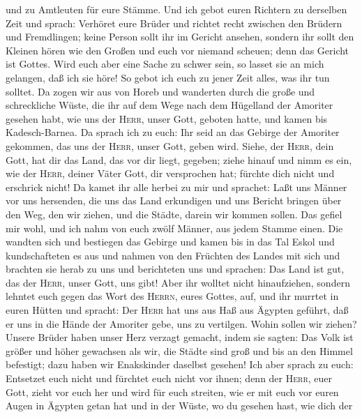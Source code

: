 und zu Amtleuten für eure Stämme.  Und ich gebot euren
Richtern zu derselben Zeit und sprach: Verhöret eure Brüder und richtet
recht zwischen den Brüdern und Fremdlingen;  keine Person
sollt ihr im Gericht ansehen, sondern ihr sollt den Kleinen hören wie
den Großen und euch vor niemand scheuen; denn das Gericht ist Gottes.
Wird euch aber eine Sache zu schwer sein, so lasset sie an mich
gelangen, daß ich sie höre!  So gebot ich euch zu jener
Zeit alles, was ihr tun solltet.  Da zogen wir aus von
Horeb und wanderten durch die große und schreckliche Wüste, die ihr auf
dem Wege nach dem Hügelland der Amoriter gesehen habt, wie uns der
\textsc{Herr}, unser Gott, geboten hatte, und kamen bis Kadesch-Barnea.
 Da sprach ich zu euch: Ihr seid an das Gebirge der
Amoriter gekommen, das uns der \textsc{Herr}, unser Gott, geben wird.
 Siehe, der \textsc{Herr}, dein Gott, hat dir das Land,
das vor dir liegt, gegeben; ziehe hinauf und nimm es ein, wie der
\textsc{Herr}, deiner Väter Gott, dir versprochen hat; fürchte dich
nicht und erschrick nicht!  Da kamet ihr alle herbei zu
mir und sprachet: Laßt uns Männer vor uns hersenden, die uns das Land
erkundigen und uns Bericht bringen über den Weg, den wir ziehen, und die
Städte, darein wir kommen sollen.  Das gefiel mir wohl,
und ich nahm von euch zwölf Männer, aus jedem Stamme einen.
 Die wandten sich und bestiegen das Gebirge und kamen bis
in das Tal Eskol und kundschafteten es aus  und nahmen
von den Früchten des Landes mit sich und brachten sie herab zu uns und
berichteten uns und sprachen: Das Land ist gut, das der \textsc{Herr},
unser Gott, uns gibt!  Aber ihr wolltet nicht
hinaufziehen, sondern lehntet euch gegen das Wort des \textsc{Herrn},
eures Gottes, auf,  und ihr murrtet in euren Hütten und
spracht: Der \textsc{Herr} hat uns aus Haß aus Ägypten geführt, daß er
uns in die Hände der Amoriter gebe, uns zu vertilgen. 
Wohin sollen wir ziehen? Unsere Brüder haben unser Herz verzagt gemacht,
indem sie sagten: Das Volk ist größer und höher gewachsen als wir, die
Städte sind groß und bis an den Himmel befestigt; dazu haben wir
Enakskinder daselbst gesehen!  Ich aber sprach zu euch:
Entsetzet euch nicht und fürchtet euch nicht vor ihnen; 
denn der \textsc{Herr}, euer Gott, zieht vor euch her und wird für euch
streiten, wie er mit euch vor euren Augen in Ägypten getan hat
 und in der Wüste, wo du gesehen hast, wie dich der
